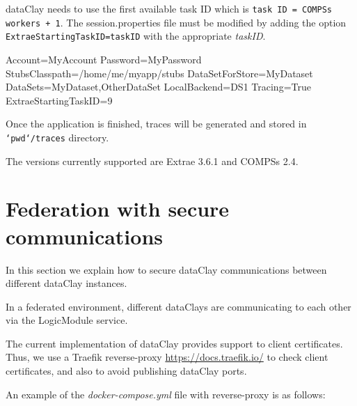 dataClay needs to use the first available task ID which is \texttt{task ID = COMPSs workers + 1}. The session.properties file must be modified by adding the option \texttt{ExtraeStartingTaskID=taskID} with the appropriate \textit{taskID}.

\begin{tBox}
 \begin{bash}
  Account=MyAccount
  Password=MyPassword
  StubsClasspath=/home/me/myapp/stubs
  DataSetForStore=MyDataset
  DataSets=MyDataset,OtherDataSet
  LocalBackend=DS1
  Tracing=True
  ExtraeStartingTaskID=9
 \end{bash}
\end{tBox}

Once the application is finished, traces will be generated and stored in \texttt{`pwd`/traces} directory. 

The versions currently supported are Extrae 3.6.1 and COMPSs 2.4.

\section{Federation with secure communications}

In this section we explain how to secure dataClay communications between different dataClay instances.

In a federated environment, different dataClays are communicating to each other via the LogicModule service. 

The current implementation of dataClay provides support to client certificates. Thus, we use a Traefik reverse-proxy \href {https://docs.traefik.io/} {https://docs.traefik.io/} to check client certificates, and also to avoid publishing dataClay ports. 

An example of the \textit{docker-compose.yml} file with reverse-proxy is as follows:

